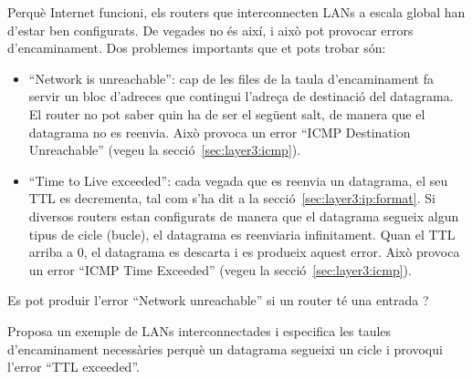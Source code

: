 Perquè Internet funcioni, els routers que interconnecten LANs a escala global han d'estar ben configurats. 
De vegades no és així, i això pot provocar errors d'encaminament. Dos problemes importants 
que et pots trobar són:
\begin{itemize}
\item ``Network is unreachable'': cap de les files de la taula d'encaminament fa servir un bloc d'adreces que contingui 
  l'adreça de destinació del datagrama. 
  El router no pot saber quin ha de ser el següent salt, de manera que el datagrama no es reenvia.
  Això provoca un error ``ICMP Destination Unreachable'' (vegeu la secció~\ref{sec:layer3:icmp}).
  
\item ``Time to Live exceeded'': cada vegada que es reenvia un datagrama,
  el seu TTL es decrementa, tal com s'ha dit a la secció~\ref{sec:layer3:ip:format}.
  Si diversos routers estan configurats de manera que el datagrama segueix algun tipus de cicle (bucle), 
  el datagrama es reenviaria infinitament.
  Quan el TTL arriba a 0, el datagrama es descarta i es produeix aquest error.
  Això provoca un error ``ICMP Time Exceeded'' (vegeu la secció~\ref{sec:layer3:icmp}).
\end{itemize}

\begin{exercise}
Es pot produir l'error ``Network unreachable'' si un router té una entrada ?
\end{exercise}

\begin{exercise}
Proposa un exemple de LANs interconnectades i especifica les taules d'encaminament necessàries perquè un datagrama 
segueixi un cicle i provoqui l'error ``TTL exceeded''.
\end{exercise}

